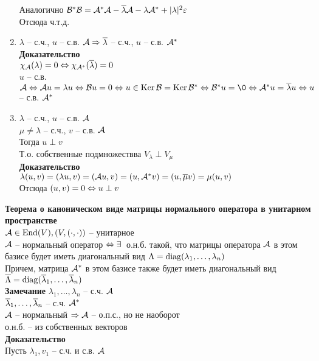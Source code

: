 \documentclass[12pt]{article}
\begin{document}
\begin{enumerate}
        Аналогично $\mathcal{B}^*\mathcal{B} = \mathcal{A}^*\mathcal{A} - \overline \lambda\mathcal{A} - \lambda\mathcal{A}^*  + | \lambda|^2\varepsilon $\\
        Отсюда ч.т.д.
    \item $ \lambda $ -- с.ч., $u$ -- с.в. $\mathcal{A} \Rightarrow \overline \lambda$ -- с.ч., $u$ -- с.в. $\mathcal{A}^*$\\
        \textbf{Доказательство}\\
        $\chi_\mathcal{A}( \lambda) = 0 \Leftrightarrow \chi_{\mathcal{A}^*}(\overline \lambda) = 0 $\\
        $u$ -- с.в. $\mcA \LRto \mcA u = \lambda u \LRto \mcB u = 0 \LRto u \in \ker \mcB = \ker \mcB^* \LRto \mcB^*u = \0 \LRto \mcA^* u = \ol \lambda u \LRto u$ -- с.в. $\mathcal{A}^*$
    \item $ \lambda$ -- с.ч., $u$ -- с.в. $\mathcal{A}$\\
        $ \mu \neq \lambda$ -- с.ч., $v$ -- с.в. $\mathcal{A}$\\
        Тогда $u \perp v$\\
        Т.о. собственные подмножествва $V_ \lambda \perp V_ \mu$\\
        \textbf{Доказательство}\\
        $ \lambda(u, v) = ( \lambda u, v) = (\mathcal{A} u, v) = (u, \mathcal{A}^* v) = (u, \overline \mu v) = \mu(u, v)$\\
        Отсюда $(u, v) = 0 \Leftrightarrow u \perp v$
\end{enumerate}
\textbf{Теорема о каноническом виде матрицы нормального оператора в унитарном пространстве}\\
$\mathcal{A} \in \operatorname{End}(V), (V, (\cdot, \cdot))$ -- унитарное\\
$\mathcal{A}$ -- нормальный оператор $\Leftrightarrow \exists\,$ о.н.б. такой, что матрицы оператора $\mathcal{A}$ в этом базисе будет иметь диагональный вид $ \Lambda = \operatorname{diag}( \lambda_1, \ldots, \lambda_n)$\\
Причем, матрица $\mathcal{A}^*$ в этом базисе также будет иметь диагональный вид $\overline{ \Lambda} = \operatorname{diag}(\overline \lambda_1, \ldots, \overline \lambda_n)$\\
\textbf{Замечание}
$ \lambda_1, \ldots, \lambda_n$ -- с.ч. $\mathcal{A}$\\
$\overline \lambda_1, \ldots, \overline \lambda_n$ -- с.ч. $\mathcal{A}^*$\\
$\mathcal{A}$ -- нормальный $\Rightarrow \mathcal{A}$ -- о.п.с., но не наоборот\\
о.н.б. -- из собственных векторов\\
\textbf{Доказательство}\\
Пусть $ \lambda_1, v_1$ -- с.ч. и с.в. $\mathcal{A}$\\
\end{document}
